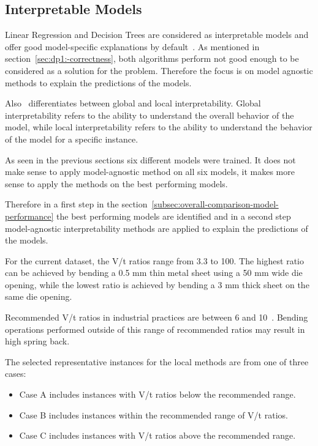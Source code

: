 %

\subsection{Interpretable Models}\label{subsec:interpretable-models}
Linear Regression and Decision Trees are considered as interpretable models and offer good
model-specific explanations by default~\cite{molnar2020interpretable}.
As mentioned in section~\ref{sec:dp1:-correctness}, both algorithms perform not good enough
to be considered as a solution for the problem.
Therefore the focus is on model agnostic methods to explain the predictions of the models.

Also~\cite{molnar2020interpretable} differentiates between global and local
interpretability. Global
interpretability refers to the ability to understand the overall behavior of
the model, while local interpretability refers to the ability to understand the behavior of the
model for a specific instance.

As seen in the previous sections six different models were trained.
It does not make sense to apply model-agnostic method on all six models, it makes more sense to
apply the methods on the best performing models.

Therefore in a first step in the section~\ref{subsec:overall-comparison-model-performance} the
best performing models
are identified and in a second step model-agnostic interpretability methods are applied to
explain the predictions of the models.

For the current dataset, the V/t ratios range from 3.3 to 100. The highest ratio can be achieved
by bending a 0.5 mm thin metal sheet using a 50 mm wide die opening, while the lowest ratio is
achieved by bending a 3 mm thick sheet on the same die opening.

Recommended V/t ratios in industrial practices are between 6 and 10~\cite[p.7]{
    cruz_applicationmachinelearning_2021}.
Bending operations performed outside of this range of recommended ratios may result in
high spring back.

The selected representative instances for the local methods are from one of three cases:
\begin{itemize}
    \item Case A includes instances with V/t ratios below the recommended range.
    \item Case B includes instances within the recommended range of V/t ratios.
    \item Case C includes instances with V/t ratios above the recommended range.
\end{itemize}

